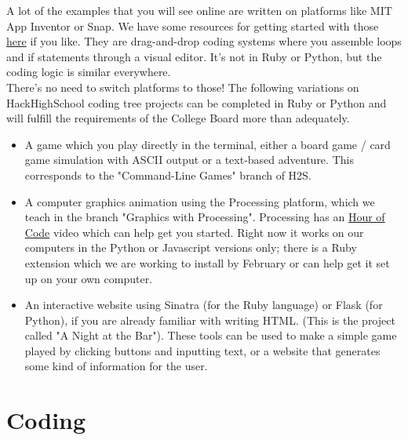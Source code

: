 \documentclass{42-en}
\begin{document}
A lot of the examples that you will see online are written on platforms like MIT App Inventor or Snap. We have some resources for getting started with those \href{https://drive.google.com/drive/folders/1WshQqwtCvUzPrkrBS7i9B0RAtSuwKdP_?usp=sharing}{here} if you like. They are drag-and-drop coding systems where you assemble loops and if statements through a visual editor. It's not in Ruby or Python, but the coding logic is similar everywhere.\\

There's no need to switch platforms to those! The following variations on HackHighSchool coding tree projects can be completed in Ruby or Python and will fulfill the requirements of the College Board more than adequately.

\begin{itemize}
	\item A game which you play directly in the terminal, either a board game / card game simulation with ASCII output or a text-based adventure. This corresponds to the "Command-Line Games" branch of H2S. 
	\item A computer graphics animation using the Processing platform, which we teach in the branch "Graphics with Processing". Processing has an \href{http://hello.processing.org/}{Hour of Code} video which can help get you started. Right now it works on our computers in the Python or Javascript versions only; there is a Ruby extension which we are working to install by February or can help get it set up on your own computer.
	\item An interactive website using Sinatra (for the Ruby language) or Flask (for Python), if you are already familiar with writing HTML. (This is the project called "A Night at the Bar"). These tools can be used to make a simple game played by clicking buttons and inputting text, or a website that generates some kind of information for the user.
\end{itemize}



\chapter{Coding}
\end{document}
